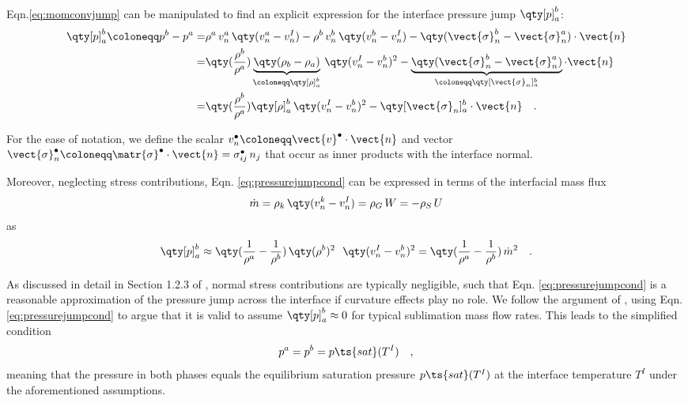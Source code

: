 Eqn.\ref{eq:momconvjump} can be manipulated to find an explicit expression for the interface pressure jump $\qty[p]_a^b$:
\begin{align}
    \qty[p]_a^b \coloneqq p^b-p^a \stackrel{}{=} &
    \rho^a\,v^a_n\,\qty(v^a_n-v^I_n) - \rho^b\,v^b_n\,\qty(v^b_n-v^I_n)  -\qty(\vect{\sigma}^b_n-\vect{\sigma}^a_n) \cdot \vect{n} \notag \\ 
    \stackrel{}{=} & 
    \qty(\frac{\rho^b}{\rho^a})\underbrace{\qty(\rho_b - \rho_a)}_{\coloneqq \qty[\rho]_a^b}
    \,\qty(v^I_n-v^b_n)^2 -\underbrace{\qty(\vect{\sigma}^b_n-\vect{\sigma}^a_n)}_{\coloneqq \qty[\vect{\sigma}_n]_a^b} \cdot \vect{n} \notag\\
    = & 
    \qty(\frac{\rho^b}{\rho^a})\qty[\rho]_a^b
    \,\qty(v^I_n-v^b_n)^2 - \qty[\vect{\sigma}_n]_a^b \cdot \vect{n}\quad . \label{eq:pressurejumpcond}
\end{align}

For the ease of notation, we define the scalar $v^\bullet_n \coloneqq \vect{v}^\bullet\cdot\vect{n}$ and vector  $\vect{\sigma}^\bullet_n \coloneqq \matr{\sigma}^\bullet\cdot\vect{n} = \sigma_{ij}^\bullet\,n_j$ that occur as inner products with the interface normal.

Moreover, neglecting stress contributions, Eqn. \ref{eq:pressurejumpcond} can be expressed in terms of the interfacial mass flux  
\begin{equation*}
    \Dot{m}=\rho_k\,\qty(v^k_n-v^I_n) = \rho_G\,W = -\rho_S\,U
\end{equation*}
as
\begin{equation}
    \qty[p]_a^b \approx \qty(\frac{1}{\rho^a}-\frac{1}{\rho^b})\,\qty(\rho^b)^2\,\
    \,\qty(v^I_n-v^b_n)^2  = \qty(\frac{1}{\rho^a}-\frac{1}{\rho^b})\,\Dot{m}^2 \quad . \notag
\end{equation}

As discussed in detail in Section 1.2.3 of \cite{ishii2010thermo}, normal stress contributions are typically negligible, such that Eqn. \ref{eq:pressurejumpcond} is a reasonable approximation of the pressure jump across the interface if curvature effects play no role. We follow the argument of \cite{ishii2010thermo}, using Eqn. \ref{eq:pressurejumpcond} to argue that it is valid to assume $\qty[p]_a^b \approx 0$ for typical sublimation mass flow rates. This leads to the simplified condition
\begin{equation}\label{eq:psatassumption}
    p^a = p^b = p\ts{sat}(T^I)\quad ,
\end{equation}
meaning that the pressure in both phases equals the equilibrium saturation pressure $p\ts{sat}(T^I)$ at the interface temperature $T^I$ under the aforementioned assumptions.

